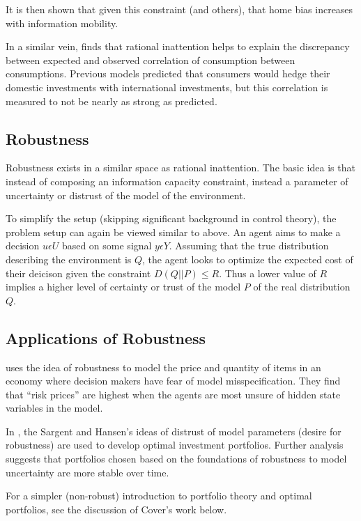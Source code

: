 \documentclass[10pt, twocolumn]{IEEEtran}
\begin{document}
It is then shown that given this constraint (and others), that home bias increases with information mobility.

In a similar vein, \cite{Li2017} finds that rational inattention helps to explain the discrepancy between expected and
observed correlation of consumption between consumptions. Previous models predicted that consumers would hedge their
domestic investments with international investments, but this correlation is measured to not be nearly as strong as
predicted.

\subsection{Robustness}
Robustness exists in a similar space as rational inattention. The basic idea is that instead of
composing an information capacity constraint, instead a parameter of uncertainty or distrust of
the model of the environment.

To simplify the setup (skipping significant background in control theory), the problem setup can
again be viewed similar to above. An agent aims to make a decision $u \epsilon U$ based on some signal $y \epsilon Y$.
Assuming that the true distribution describing the environment is $Q$, the agent looks to optimize the expected cost of
their deicison given the constraint $D(Q||P) \le R$. Thus a lower value of $R$ implies a higher level of certainty or
trust of the model $P$ of the real distribution $Q$.

\subsection{Applications of Robustness}

\cite{sargent2015} uses the idea of robustness to model the price and quantity of items in an economy where decision
makers have fear of model misspecification. They find that ``risk prices'' are highest when the agents are most
unsure of hidden state variables in the model.

In \cite{robustPortfolio}, the Sargent and Hansen's ideas of distrust of model parameters (desire for robustness)
are used to develop optimal investment portfolios. Further analysis suggests that portfolios chosen based
on the foundations of robustness to model uncertainty are more stable over time.

For a simpler (non-robust) introduction to portfolio theory and optimal portfolios, see the discussion of Cover's
work below.
\end{document}
